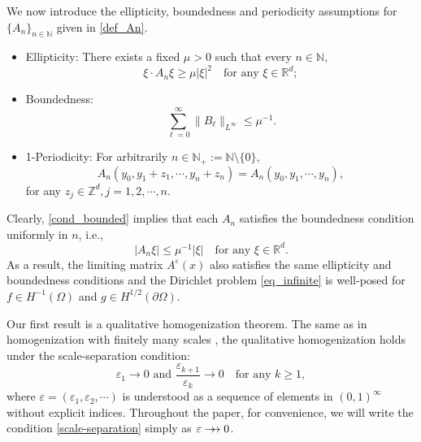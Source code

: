 \documentclass[reqno,12pt]{amsart} %
\theoremstyle{definition}
\theoremstyle{remark}
\numberwithin{equation}{section}
\newcommand{\Z}{\mathbb{Z}}
\newcommand{\R}{\mathbb{R}}
\newcommand{\N}{\mathbb{N}}
\newcommand{\e}{\varepsilon}
\newcommand{\jz}[1]{\textcolor{red}{#1}}
\newcommand{\doublerightarrow}{%
  \mathrel{%
    \mathchoice
      {\rightarrow\mspace{-10mu}\rightarrow} %
      {\rightarrow\mspace{-10mu}\rightarrow} %
      {\rightarrow\mspace{-10mu}\rightarrow} %
      {\rightarrow\mspace{-10mu}\rightarrow} %
  }%
}
\begin{document}
We now introduce the ellipticity, boundedness and periodicity assumptions for $\{ A_n\}_{n\in \N}$ given in \eqref{def_An}.
\begin{itemize}
    \item Ellipticity: There exists a fixed $\mu > 0$ such that every $n \in \N$,
    \begin{equation}\label{cond_ellipticity}
        \xi \cdot A_n\xi \geq \mu|\xi|^2\quad \text{for any }\xi \in\mathbb{R}^{d}; 
    \end{equation}

    \item Boundedness: 
    \begin{equation}\label{cond_bounded}
        \sum_{\ell = 0}^\infty \| B_\ell \|_{L^\infty} \le \mu^{-1}.
    \end{equation}

    \item 1-Periodicity: For arbitrarily $n \in \N_+:= \N \setminus \{0\}$,
    \begin{equation}\label{cond_periodicity}
        A_n(y_0, y_1 + z_1, \cdots, y_n + z_n ) = A_n(y_0, y_1, \cdots, y_n),
    \end{equation}
    for any $z_j \in \Z^d, j = 1,2,\cdots, n$.
\end{itemize}
Clearly, \eqref{cond_bounded} implies that each $A_n$ satisfies the boundedness condition uniformly in $n$, i.e., 
\begin{equation}\label{cond_bounded-A}
    |A_n \xi| \le \mu^{-1} |\xi| \quad \text{for any } \xi\in \R^d.
\end{equation}
As a result, the limiting matrix $A^\varepsilon(x)$ also satisfies the same ellipticity and boundedness conditions and the Dirichlet problem \eqref{eq_infinite} is well-posed for $f\in H^{-1}(\Omega)$ and $g\in H^{1/2}(\partial \Omega)$. %


Our first result is a qualitative homogenization theorem. The same as in homogenization with finitely many scales \cite{Allaire1996Multiscale}, the qualitative homogenization holds under the scale-separation condition:
\begin{equation}\label{scale-separation}
    \e_1 \to 0 \text{ and } \frac{\e_{k+1}}{\e_k} \to 0 \quad \text{for any } k \ge 1,
\end{equation}
where $\e = (\e_1,\e_2,\cdots)$ is understood as a sequence of elements in $(0,1)^\infty$ without explicit indices. Throughout the paper, for convenience, we will write the condition \eqref{scale-separation} simply as $\e \doublerightarrow 0$.
\end{document}

